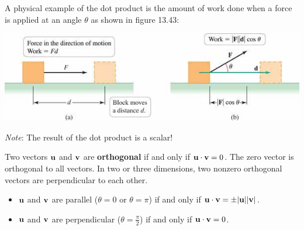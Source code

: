 \documentclass[mathNotesPreamble]{subfiles}
\begin{document}
\begin{center}
  \end{center}

  \noindent
  A physical example of the dot product is the amount of work done when a force is applied at an angle $\theta$ as shown in figure 13.43:
  \begin{center}
    \includegraphics[width=0.75\linewidth]{images/briggs_13_03/fig13_43}
    
    \textit{Note}: The result of the dot product is a scalar!
  \end{center}
  \pagebreak
  
  \begin{defn*}
    Two vectors ${\mathbf{u}}$ and ${\mathbf{v}}$ are \textbf{orthogonal} if and only if ${\mathbf{u}}\cdot{\mathbf{v}}=0$. The zero vector is orthogonal to all vectors. In two or three dimensions, two nonzero orthogonal vectors are perpendicular to each other.
  \end{defn*}
  \begin{itemize}
    \item ${\mathbf{u}}$ and ${\mathbf{v}}$ are parallel ($\theta=0$ or $\theta=\pi$) if and only if ${\mathbf{u}}\cdot{\mathbf{v}}=\pm{\left\vert{\mathbf{u}}\right\vert}{\left\vert{\mathbf{v}}\right\vert}$.
    \item ${\mathbf{u}}$ and ${\mathbf{v}}$ are perpendicular ($\theta=\frac{\pi}{2}$) if and only if ${\mathbf{u}}\cdot{\mathbf{v}}=0$.
  \end{itemize}
  
\end{document}
